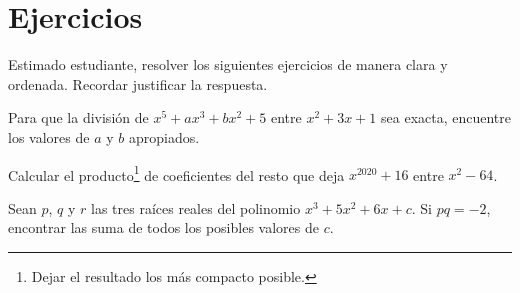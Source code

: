 \section*{\large Ejercicios}

Estimado estudiante, resolver los siguientes ejercicios de manera clara y ordenada. Recordar justificar la respuesta.

\begin{exercise}
    Para que la división de $x^5 + ax^3 + bx^2 + 5$ entre $x^2 + 3x + 1$ sea exacta, encuentre los valores de $a$ y $b$ apropiados.
\end{exercise}

\begin{exercise}
    Calcular el producto\footnote{Dejar el resultado los más compacto posible.} de coeficientes del resto que deja $x^{2020} + 16$ entre $x^2 - 64$.
\end{exercise}

\begin{exercise}
    Sean $p$, $q$ y $r$ las tres raíces reales del polinomio $x^3 + 5x^2 + 6x + c$.
    Si $pq = -2$, encontrar las suma de todos los posibles valores de $c$.
\end{exercise}

%